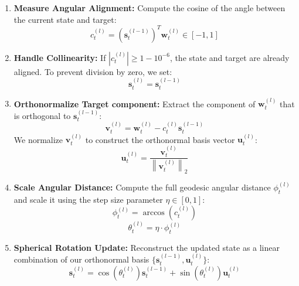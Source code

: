 \begin{enumerate}
    \item \textbf{Measure Angular Alignment:} Compute the cosine of the angle between the current state and target:
    \begin{equation}
    c_t^{(l)} = \left(\mathbf{s}_t^{(l-1)}\right)^T \mathbf{w}_t^{(l)} \in [-1, 1]
    \end{equation}
    
    \item \textbf{Handle Collinearity:} If $\left|c_t^{(l)}\right| \ge 1 - 10^{-6}$, the state and target are already aligned. To prevent division by zero, we set:
    \begin{equation}
    \mathbf{s}_t^{(l)} = \mathbf{s}_t^{(l-1)}
    \end{equation}
    
    \item \textbf{Orthonormalize Target component:} Extract the component of $\mathbf{w}_t^{(l)}$ that is orthogonal to $\mathbf{s}_t^{(l-1)}$:
    \begin{equation}
    \mathbf{v}_t^{(l)} = \mathbf{w}_t^{(l)} - c_t^{(l)} \mathbf{s}_t^{(l-1)}
    \end{equation}
    We normalize $\mathbf{v}_t^{(l)}$ to construct the orthonormal basis vector $\mathbf{u}_t^{(l)}$:
    \begin{equation}
    \mathbf{u}_t^{(l)} = \frac{\mathbf{v}_t^{(l)}}{\left\|\mathbf{v}_t^{(l)}\right\|_2}
    \end{equation}
    
    \item \textbf{Scale Angular Distance:} Compute the full geodesic angular distance $\phi_t^{(l)}$ and scale it using the step size parameter $\eta \in [0, 1]$:
    \begin{equation}
    \phi_t^{(l)} = \arccos\left(c_t^{(l)}\right)
    \end{equation}
    \begin{equation}
    \theta_t^{(l)} = \eta \cdot \phi_t^{(l)}
    \end{equation}
    
    \item \textbf{Spherical Rotation Update:} Reconstruct the updated state as a linear combination of our orthonormal basis $\{\mathbf{s}_t^{(l-1)}, \mathbf{u}_t^{(l)}\}$:
    \begin{equation}
    \mathbf{s}_t^{(l)} = \cos\left(\theta_t^{(l)}\right) \mathbf{s}_t^{(l-1)} + \sin\left(\theta_t^{(l)}\right) \mathbf{u}_t^{(l)}
    \label{eq:slerp}
    \end{equation}
\end{enumerate}

